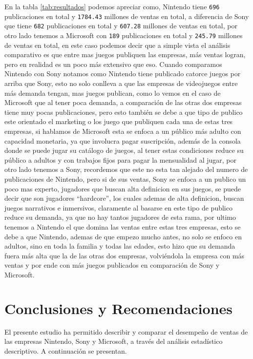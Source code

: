 \documentclass[oneside,11pt]{Latex/Classes/PhDthesisPSnPDF}
\begin{document}
En la tabla \ref{tab:resultados} podemos apreciar como, Nintendo tiene
\texttt{696} publicaciones en total y \texttt{1784.43} millones de
ventas en total, a diferencia de Sony que tiene \texttt{682}
publicaciones en total y \texttt{607.28} millones de ventas en total,
por otro lado tenemos a Microsoft con \texttt{189} publicaciones en
total y \texttt{245.79} millones de ventas en total, en este caso
podemos decir que a simple vista el análisis comparativo es que entre
mas juegos publiquen las empresas, más ventas logran, pero en realidad
es un poco más extensivo que eso. Cuando comparamos Nintendo con Sony
notamos como Nintendo tiene publicado catorce juegos por arriba que
Sony, esto no solo conlleva a que las empresas de videojuegos entre más
demanda tengan, mas juegos publican, como lo vemos en el caso de
Microsoft que al tener poca demanda, a comparación de las otras dos
empresas tiene muy pocas publicaciones, pero esto también se debe a que
tipo de publico este orientado el marketing o los juego que publiquen
cada una de estas tres empresas, si hablamos de Microsoft esta se enfoca
a un público más adulto con capacidad monetaria, ya que involucra pagar
suscripción, además de la consola donde se puede jugar su catálogo de
juegos, al tener estas condiciones reduce su público a adultos y con
trabajos fijos para pagar la mensualidad al jugar, por otro lado tenemos
a Sony, recordemos que este no esta tan alejado del numero de
publicaciones de Nintendo, pero si de sus ventas, Sony se enfoca a un
publico un poco mas experto, jugadores que buscan alta definicion en sus
juegos, se puede decir que son jugadores ``hardcore'', los cuales ademas
de alta definicion, buscan juegos narrativos e inmersivos, claramente al
basarse en este tipo de publico reduce su demanda, ya que no hay tantos
jugadores de esta rama, por ultimo tenemos a Nintendo el que domina las
ventas entre estas tres empresas, esto se debe a que Nintendo, ademas de
que empezo mucho antes, no solo se enfoco en adultos, sino en toda la
familia y todas las edades, esto hizo que su demanda fuera más alta que
la de las otras dos empresas, volviéndola la empresa con más ventas y
por ende con más juegos publicados en comparación de Sony y Microsoft.

\chapter{Conclusiones y Recomendaciones}

El presente estudio ha permitido describir y comparar el desempeño de
ventas de las empresas Nintendo, Sony y Microsoft, a través del análisis
estadístico descriptivo. A continuación se presentan.\\
\end{document}
